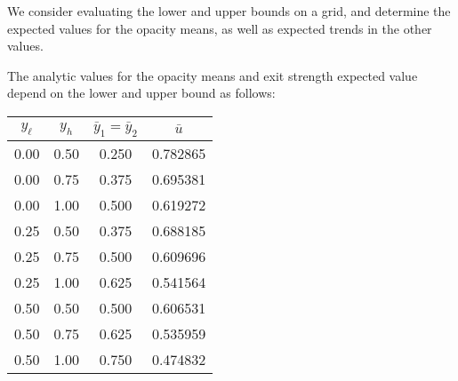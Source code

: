 We consider evaluating the lower and upper bounds
on a grid, and determine the expected values for the opacity means, as well as expected trends in the other
values.

The analytic values for the opacity means and exit strength expected value depend on the lower and upper bound
as follows:

\begin{table}[h!]
\centering
\begin{tabular}{c c|c|c}
$y_\ell$ & $y_h$ & $\bar y_1=\bar y_2$ & $\bar u$ \\ \hline
0.00 & 0.50 & 0.250 & 0.782865 \\
0.00 & 0.75 & 0.375 & 0.695381 \\
0.00 & 1.00 & 0.500 & 0.619272 \\
0.25 & 0.50 & 0.375 & 0.688185 \\
0.25 & 0.75 & 0.500 & 0.609696 \\
0.25 & 1.00 & 0.625 & 0.541564 \\
0.50 & 0.50 & 0.500 & 0.606531 \\
0.50 & 0.75 & 0.625 & 0.535959 \\
0.50 & 1.00 & 0.750 & 0.474832
\end{tabular}
\end{table}

